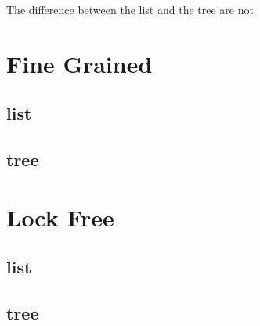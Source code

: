 \documentclass[10pt,a4paper]{article}
\begin{document}
The difference between the list and the tree are not 

\section{Fine Grained}
\subsection{list}
\subsection{tree}

\section{Lock Free}
\subsection{list}
\subsection{tree}
\end{document}
